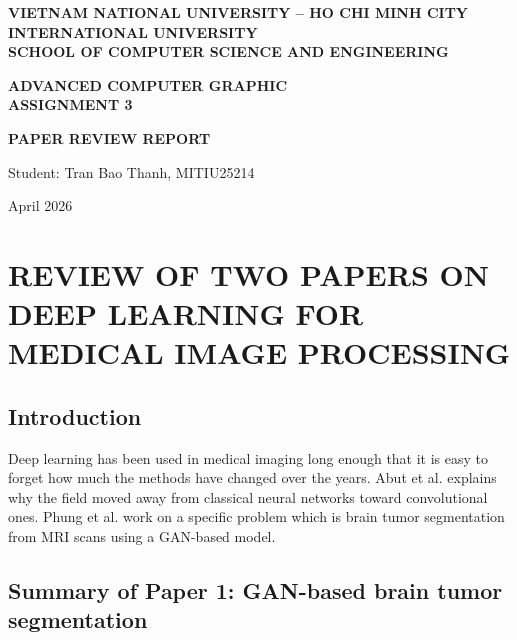 \documentclass[12pt]{extreport}
\begin{document}
\begin{titlepage}
    \centering
    \vspace*{1cm}
    \textbf{VIETNAM NATIONAL UNIVERSITY -- HO CHI MINH CITY}\\
    \textbf{INTERNATIONAL UNIVERSITY}\\
    \textbf{SCHOOL OF COMPUTER SCIENCE AND ENGINEERING}

    \vspace{3cm}
    \textbf{ADVANCED COMPUTER GRAPHIC}\\
    \textbf{ASSIGNMENT 3}

    \vspace{4cm}
    \textbf{PAPER REVIEW REPORT}

    \vspace{3cm}
    \begin{flushleft}
    \hspace{4cm} Student: Tran Bao Thanh, MITIU25214 \\
    \end{flushleft}

    \vfill
    April 2026
\end{titlepage}

\setcounter{page}{2}
\tableofcontents
\newpage

\chapter{REVIEW OF TWO PAPERS ON DEEP LEARNING FOR MEDICAL IMAGE PROCESSING}

\section{Introduction}

Deep learning has been used in medical imaging long enough that it is easy to forget how much the methods have changed over the years. Abut et al. \cite{paper2023} explains why the field moved away from classical neural networks toward convolutional ones. Phung et al. \cite{paper2022} work on a specific problem which is brain tumor segmentation from MRI scans using a GAN-based model.

\section{Summary of Paper 1: GAN-based brain tumor segmentation}
\end{document}
